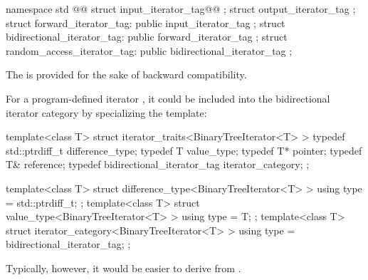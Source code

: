 \begin{codeblock}
namespace std {
  @@
  struct input_iterator_tag@@ { };
  struct output_iterator_tag { };
  struct forward_iterator_tag: public input_iterator_tag { };
  struct bidirectional_iterator_tag: public forward_iterator_tag { };
  struct random_access_iterator_tag: public bidirectional_iterator_tag { };
}
\end{codeblock}

\begin{addedblock}
\pnum
\enternote
The  is provided for the sake of backward compatibility.
\exitnote
\end{addedblock}

\pnum
{}%
%
%
%
%
%
%
\enterexample
For a program-defined iterator
,
it could be included
into the bidirectional iterator category by specializing the
\added{, }
 template:

\begin{removedblock}
\begin{codeblock}
template<class T> struct iterator_traits<BinaryTreeIterator<T> > {
  typedef std::ptrdiff_t difference_type;
  typedef T value_type;
  typedef T* pointer;
  typedef T& reference;
  typedef bidirectional_iterator_tag iterator_category;
};
\end{codeblock}
\end{removedblock}
\begin{addedblock}
\begin{codeblock}
template<class T> struct difference_type<BinaryTreeIterator<T> > {
  using type = std::ptrdiff_t;
};
template<class T> struct value_type<BinaryTreeIterator<T> > {
  using type = T;
};
template<class T> struct iterator_category<BinaryTreeIterator<T> > {
  using type = bidirectional_iterator_tag;
};
\end{codeblock}
\end{addedblock}

Typically, however, it would be easier to derive
from
.
\exitexample

